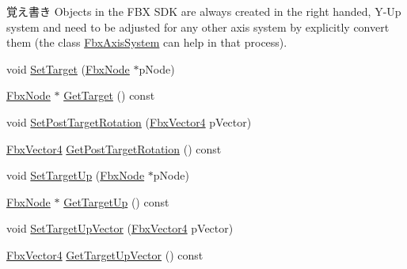 \begin{Indent}
{\begin{DoxyNote}{覚え書き}
Objects in the F\+BX S\+DK are always created in the right handed, Y-\/\+Up system and need to be adjusted for any other axis system by explicitly convert them (the class \hyperlink{class_fbx_axis_system}{Fbx\+Axis\+System} can help in that process). 
\end{DoxyNote}
}\begin{DoxyCompactItemize}
\item 
void \hyperlink{class_fbx_node_af421a29f73f7de9f52061c2661569f16}{Set\+Target} (\hyperlink{class_fbx_node}{Fbx\+Node} $\ast$p\+Node)
\item 
\hyperlink{class_fbx_node}{Fbx\+Node} $\ast$ \hyperlink{class_fbx_node_a27c131db236dfa152db38b6027b9f7ec}{Get\+Target} () const
\item 
void \hyperlink{class_fbx_node_a6c21a98a97d564dc49e09086abccecd5}{Set\+Post\+Target\+Rotation} (\hyperlink{class_fbx_vector4}{Fbx\+Vector4} p\+Vector)
\item 
\hyperlink{class_fbx_vector4}{Fbx\+Vector4} \hyperlink{class_fbx_node_ab484186dcdd304a6649b1d4e3fbfc633}{Get\+Post\+Target\+Rotation} () const
\item 
void \hyperlink{class_fbx_node_a1970908c54d4a64e8301c1445908c523}{Set\+Target\+Up} (\hyperlink{class_fbx_node}{Fbx\+Node} $\ast$p\+Node)
\item 
\hyperlink{class_fbx_node}{Fbx\+Node} $\ast$ \hyperlink{class_fbx_node_a06208ef541696ed4bfb38623cd23986f}{Get\+Target\+Up} () const
\item 
void \hyperlink{class_fbx_node_a70fbe06cf416490205e21e9b79ae76ec}{Set\+Target\+Up\+Vector} (\hyperlink{class_fbx_vector4}{Fbx\+Vector4} p\+Vector)
\item 
\hyperlink{class_fbx_vector4}{Fbx\+Vector4} \hyperlink{class_fbx_node_a59fb630574cb61b0158495ab751f092e}{Get\+Target\+Up\+Vector} () const
\end{DoxyCompactItemize}
\end{Indent}
